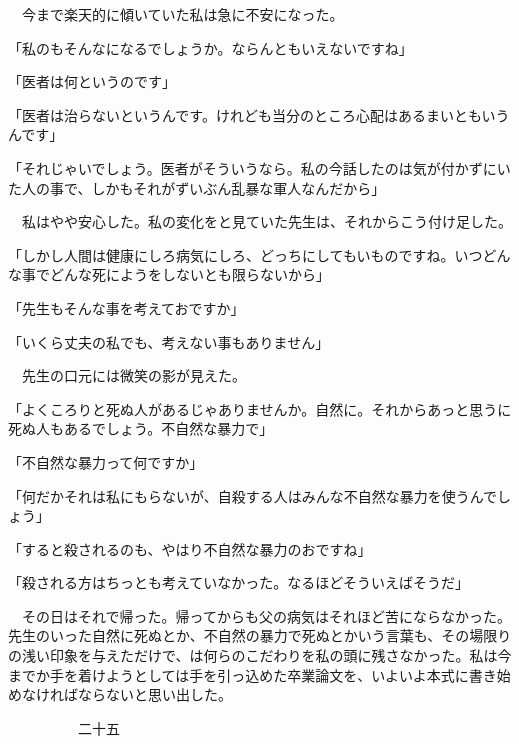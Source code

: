 \documentclass[a4j,onecolumn]{tarticle}
\begin{document}
　今まで楽天的に傾いていた私は急に不安になった。\hbox{}\par{}
「私のもそんなになるでしょうか。\hbox{}ならんともいえないですね」\par{}
「医者は何というのです」\par{}
「医者は治らないというんです。\hbox{}けれども当分のところ心配はあるまいともいうんです」\par{}
「それじゃいでしょう。\hbox{}医者がそういうなら。\hbox{}私の今話したのは気が付かずにいた人の事で、\hbox{}しかもそれがずいぶん乱暴な軍人なんだから」\par{}
　私はやや安心した。\hbox{}私の変化をと見ていた先生は、\hbox{}それからこう付け足した。\hbox{}\par{}
「しかし人間は健康にしろ病気にしろ、\hbox{}どっちにしてもいものですね。\hbox{}いつどんな事でどんな死にようをしないとも限らないから」\par{}
「先生もそんな事を考えておですか」\par{}
「いくら丈夫の私でも、\hbox{}考えない事もありません」\par{}
　先生の口元には微笑の影が見えた。\hbox{}\par{}
「よくころりと死ぬ人があるじゃありませんか。\hbox{}自然に。\hbox{}それからあっと思うに死ぬ人もあるでしょう。\hbox{}不自然な暴力で」\par{}
「不自然な暴力って何ですか」\par{}
「何だかそれは私にもらないが、\hbox{}自殺する人はみんな不自然な暴力を使うんでしょう」\par{}
「すると殺されるのも、\hbox{}やはり不自然な暴力のおですね」\par{}
「殺される方はちっとも考えていなかった。\hbox{}なるほどそういえばそうだ」\par{}
　その日はそれで帰った。\hbox{}帰ってからも父の病気はそれほど苦にならなかった。\hbox{}先生のいった自然に死ぬとか、\hbox{}不自然の暴力で死ぬとかいう言葉も、\hbox{}その場限りの浅い印象を与えただけで、\hbox{}は何らのこだわりを私の頭に残さなかった。\hbox{}私は今までか手を着けようとしては手を引っ込めた卒業論文を、\hbox{}いよいよ本式に書き始めなければならないと思い出した。\hbox{}\par{}\par{}　　　　　二十五
\par{}
\end{document}
